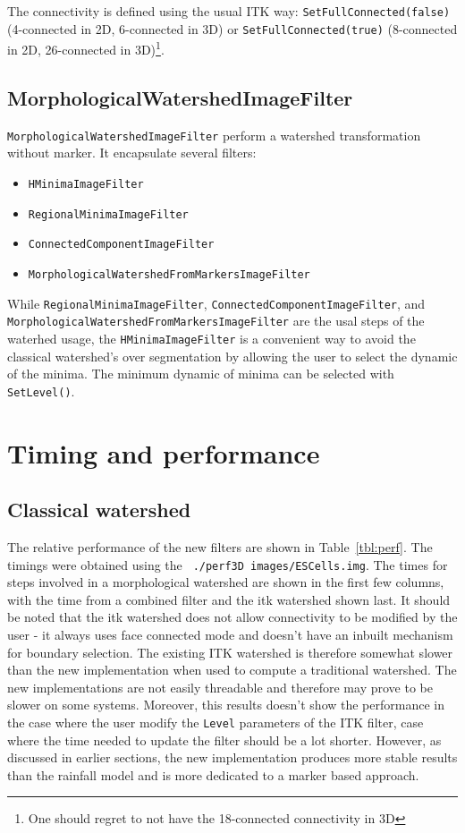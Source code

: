\documentclass{InsightArticle}
\begin{document}
The connectivity is defined using the usual ITK way: \verb$SetFullConnected(false)$
(4-connected in 2D, 6-connected in 3D) or \verb$SetFullConnected(true)$ (8-connected
in 2D, 26-connected in 3D)\footnote{One should regret to not have the 18-connected
connectivity in 3D}.

  \subsection{MorphologicalWatershedImageFilter}

\verb$MorphologicalWatershedImageFilter$ perform a watershed transformation
without marker. It encapsulate several filters:
\begin{itemize}
  \item \verb$HMinimaImageFilter$
  \item \verb$RegionalMinimaImageFilter$
  \item \verb$ConnectedComponentImageFilter$
  \item \verb$MorphologicalWatershedFromMarkersImageFilter$
\end{itemize}
While \verb$RegionalMinimaImageFilter$, \verb$ConnectedComponentImageFilter$,
and \verb$MorphologicalWatershedFromMarkersImageFilter$ are the usal steps
of the waterhed usage, the \verb$HMinimaImageFilter$ is a convenient way
to avoid the classical watershed's over segmentation by allowing the user
to select the dynamic of the minima. The minimum dynamic of minima can be
selected with \verb$SetLevel()$.


\section{Timing and performance}
\label{sect:perf}

  \subsection{Classical watershed}
\label{sect:perf-classical}

The relative performance of the new filters are shown in
Table~\ref{tbl:perf}. The timings were obtained using the {\tt
./perf3D images/ESCells.img}. The times for steps involved in a
morphological watershed are shown in the first few columns, with the
time from a combined filter and the itk watershed shown last. It
should be noted that the itk watershed does not allow connectivity to
be modified by the user - it always uses face connected mode and
doesn't have an inbuilt mechanism for boundary selection. The existing
ITK watershed is therefore somewhat slower than the new implementation
when used to compute a traditional watershed. The new implementations
are not easily threadable and therefore may prove to be slower on some
systems. Moreover, this results doesn't show the performance in the
case where the user modify the \verb$Level$ parameters of the ITK
filter, case where the time needed to update the filter should be a lot
shorter. However, as discussed in earlier sections, the new
implementation produces more stable results than the rainfall model
and is more dedicated to a marker based approach.
\end{document}
